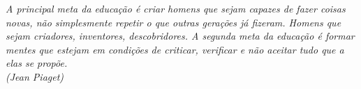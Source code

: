   

\newpage
\begin{dedicatoria}
   \vspace*{\fill}
   \centering
   \noindent
   \textit{A principal meta da educação é criar homens que sejam capazes de fazer coisas novas, não simplesmente repetir o que outras gerações já fizeram. Homens que sejam criadores, inventores, descobridores. A segunda meta da educação é formar mentes que estejam em condições de criticar, verificar e não aceitar tudo que a elas se propõe.\\
   (Jean Piaget)} 
   \vspace*{\fill}
\end{dedicatoria}




